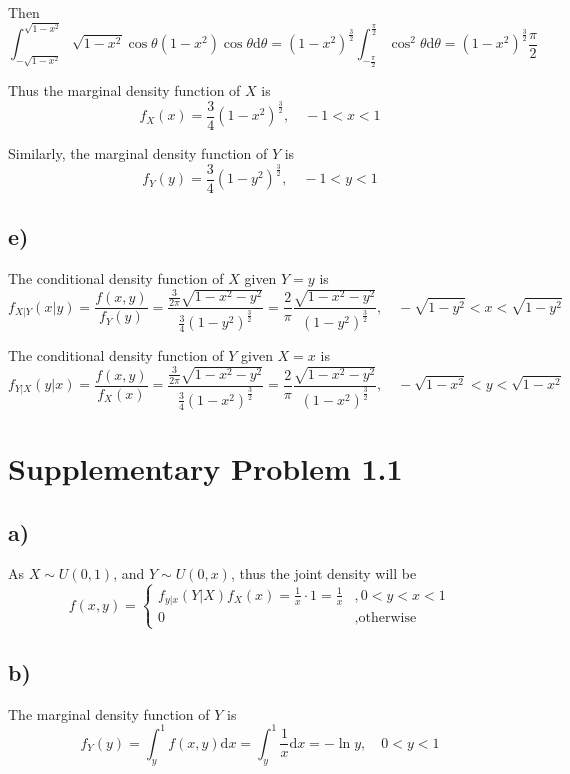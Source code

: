 \documentclass[a4paper, UTF-8]{article}
\theoremstyle{plain}
\begin{document}
Then 
$$
\int_{-\sqrt{1-x^2}}^{\sqrt{1-x^2}}\sqrt{1-x^2}\cos \theta (1-x^2)\cos \theta \mathrm{d}\theta = (1-x^2)^{\frac{3}{2}} \int_{-\frac{\pi}{2}}^{\frac{\pi}{2}} \cos^2 \theta \mathrm{d}\theta = (1-x^2)^{\frac{3}{2}} \frac{\pi}{2} 
$$

Thus the marginal density function of $X$ is
$$
f_X(x) = \frac{3}{4}(1-x^2)^{\frac{3}{2}}, \quad -1 < x < 1
$$

Similarly, the marginal density function of $Y$ is
$$
f_Y(y) = \frac{3}{4}(1-y^2)^{\frac{3}{2}}, \quad -1 < y < 1
$$

\subsection{e)} 

The conditional density function of $X$ given $Y = y$ is
$$
f_{X|Y}(x|y) = \frac{f(x,y)}{f_Y(y)} = \frac{\frac{3}{2\pi}\sqrt{1-x^2-y^2}}{\frac{3}{4}(1-y^2)^{\frac{3}{2}}} = \frac{2}{\pi}\frac{\sqrt{1-x^2-y^2}}{(1-y^2)^{\frac{3}{2}}}, \quad -\sqrt{1-y^2} < x < \sqrt{1-y^2}
$$

The conditional density function of $Y$ given $X = x$ is
$$
f_{Y|X}(y|x) = \frac{f(x,y)}{f_X(x)} = \frac{\frac{3}{2\pi}\sqrt{1-x^2-y^2}}{\frac{3}{4}(1-x^2)^{\frac{3}{2}}} = \frac{2}{\pi}\frac{\sqrt{1-x^2-y^2}}{(1-x^2)^{\frac{3}{2}}}, \quad -\sqrt{1-x^2} < y < \sqrt{1-x^2}
$$

\section{Supplementary Problem 1.1} 

\subsection{a)} 

As $X \sim U(0, 1)$, and $Y \sim U(0, x)$, thus the joint density will be 
$$
f(x,y) = \begin{cases} 
f_{y|x}(Y|X)f_{X}(x) = \frac{1}{x} \cdot 1 = \frac{1}{x} &, 0 < y < x < 1\\
0 &, \text{otherwise}
\end{cases}
$$

\subsection{b)} 

The marginal density function of $Y$ is 
$$
f_Y(y) = \int_{y}^1 f(x,y) \mathrm{d}x = \int_{y}^1 \frac{1}{x} \mathrm{d}x = -\ln y, \quad 0 < y < 1
$$
\end{document}
